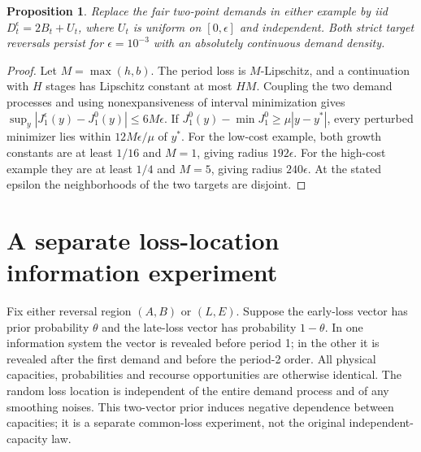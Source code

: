 \documentclass[11pt]{article}
\newtheorem{proposition}[theorem]{Proposition}
\theoremstyle{remark}\newtheorem{remark}[theorem]{Remark}
\begin{document}
\begin{proposition}\label{prop:continuous}
Replace the fair two-point demands in either example by iid
$D_t^\epsilon=2B_t+U_t$, where $U_t$ is uniform on $[0,\epsilon]$
and independent. Both strict target reversals persist for
$\epsilon=10^{-3}$ with an absolutely continuous demand density.
\end{proposition}
\begin{proof}
Let $M=\max(h,b)$. The period loss is $M$-Lipschitz, and a continuation
with $H$ stages has Lipschitz constant at most $HM$. Coupling the two
demand processes and using nonexpansiveness of interval minimization
gives $\sup_y|J_1^\epsilon(y)-J_1^0(y)|\le6M\epsilon$.
If $J_1^0(y)-\min J_1^0\ge\mu|y-y^*|$, every perturbed minimizer
lies within $12M\epsilon/\mu$ of $y^*$. For the low-cost example,
both growth constants are at least $1/16$ and $M=1$, giving radius
$192\epsilon$. For the high-cost example they are at least $1/4$
and $M=5$, giving radius $240\epsilon$. At the stated epsilon the
neighborhoods of the two targets are disjoint.
\end{proof}

\section{A separate loss-location information experiment}\label{sec:information}
Fix either reversal region $(A,B)$ or $(L,E)$. Suppose the early-loss
vector has prior probability $\theta$ and the late-loss vector has
probability $1-\theta$. In one information system the vector is revealed
before period 1; in the other it is revealed after the first demand and
before the period-2 order. All physical capacities, probabilities and
recourse opportunities are otherwise identical. The random loss location
is independent of the entire demand process and of any smoothing noises.
This two-vector prior
induces negative dependence between capacities; it is a separate
common-loss experiment, not the original independent-capacity law.
\end{document}
